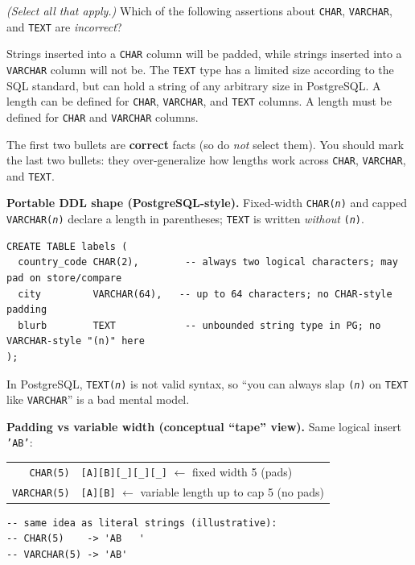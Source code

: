 \question[4]
\textit{(Select all that apply.)} Which of the following assertions about \texttt{CHAR}, \texttt{VARCHAR}, and \texttt{TEXT} are \emph{incorrect}?
\begin{checkboxes}
  \choice Strings inserted into a \texttt{CHAR} column will be padded, while strings inserted into a \texttt{VARCHAR} column will not be.
  \choice The \texttt{TEXT} type has a limited size according to the SQL standard, but can hold a string of any arbitrary size in PostgreSQL.
  \CorrectChoice A length can be defined for \texttt{CHAR}, \texttt{VARCHAR}, and \texttt{TEXT} columns.
  \CorrectChoice A length must be defined for \texttt{CHAR} and \texttt{VARCHAR} columns.
\end{checkboxes}
\begin{solution}
  The first two bullets are \textbf{correct} facts (so do \emph{not} select them). You should mark the last two bullets: they over-generalize how lengths work across \texttt{CHAR}, \texttt{VARCHAR}, and \texttt{TEXT}.

  \medskip\noindent\textbf{Portable DDL shape (PostgreSQL-style).} Fixed-width \texttt{CHAR(\textit{n})} and capped \texttt{VARCHAR(\textit{n})} declare a length in parentheses; \texttt{TEXT} is written \emph{without} \texttt{(\textit{n})}.
\begin{lstlisting}[style=sqlexam]
CREATE TABLE labels (
  country_code CHAR(2),        -- always two logical characters; may pad on store/compare
  city         VARCHAR(64),   -- up to 64 characters; no CHAR-style padding
  blurb        TEXT            -- unbounded string type in PG; no VARCHAR-style "(n)" here
);
\end{lstlisting}
  In PostgreSQL, \texttt{TEXT(\textit{n})} is not valid syntax, so ``you can always slap \texttt{(\textit{n})} on \texttt{TEXT} like \texttt{VARCHAR}'' is a bad mental model.

  \medskip\noindent\textbf{Padding vs variable width (conceptual ``tape'' view).} Same logical insert \texttt{'AB'}:
\begin{center}
{\ttfamily\small
\begin{tabular}{@{}r@{ }l@{}}
  \texttt{CHAR(5)}     & \texttt{[A][B][\_][\_][\_]} \quad $\leftarrow$ fixed width 5 (pads) \\
  \texttt{VARCHAR(5)}  & \texttt{[A][B]} \quad $\leftarrow$ variable length up to cap 5 (no pads) \\
\end{tabular}\par}
\end{center}
\begin{lstlisting}[style=sqlexam]
-- same idea as literal strings (illustrative):
-- CHAR(5)    -> 'AB   '
-- VARCHAR(5) -> 'AB'
\end{lstlisting}


\end{solution}
